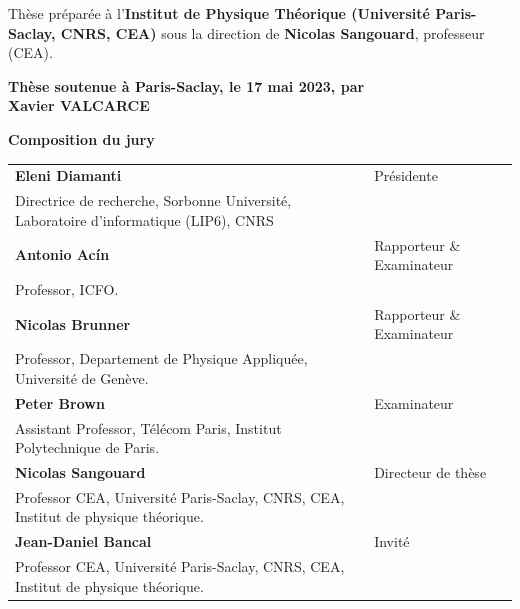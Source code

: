 \documentclass[french,12pt,a4paper]{book}
\begin{document}
\begin{titlepage}
		\footnotesize Thèse préparée à l’\textbf{Institut de Physique Théorique (Université Paris-Saclay, CNRS, CEA)} sous la direction de \textbf{Nicolas Sangouard}, professeur (CEA). \\
		\vspace{15mm}
		
		\textbf{Thèse soutenue à Paris-Saclay, le 17 mai 2023, par}\\
		\bigskip
		\Large {\color{Prune} \textbf{Xavier VALCARCE}}
		
		\vspace{\fill} %
		
		\bigskip
		
		\flushleft
		\small \textbf{Composition du jury}\\
		\vspace{2mm}
		\scriptsize
		\begin{tabular}{|p{7cm}l}
			\arrayrulecolor{Prune}
			\textbf{Eleni Diamanti} & Présidente\\ 
			Directrice de recherche, Sorbonne Université, Laboratoire d'informatique (LIP6), CNRS & \\
			\textbf{Antonio Ac\'in} &  Rapporteur \& Examinateur \\ 
			Professor, ICFO.   &   \\ 
			\textbf{Nicolas Brunner} &  Rapporteur \& Examinateur \\ 
			Professor, Departement de Physique Appliquée, Université de Genève.  &   \\ 
			\textbf{Peter Brown} &  Examinateur \\ 
			Assistant Professor, Télécom Paris, Institut Polytechnique de Paris.   &   \\ 
			\textbf{Nicolas Sangouard} &  Directeur de thèse \\ 
			Professor CEA, Université Paris-Saclay, CNRS, CEA, Institut de physique théorique.   &   \\ 
			\textbf{Jean-Daniel Bancal} &  Invité \\ 
			Professor CEA, Université Paris-Saclay, CNRS, CEA, Institut de physique théorique.   &   
		\end{tabular} 
		
	\end{titlepage}

\Ifthispageodd{\newpage\thispagestyle{empty}\null\newpage}{}
\thispagestyle{empty}
\selectfont
\end{document}
